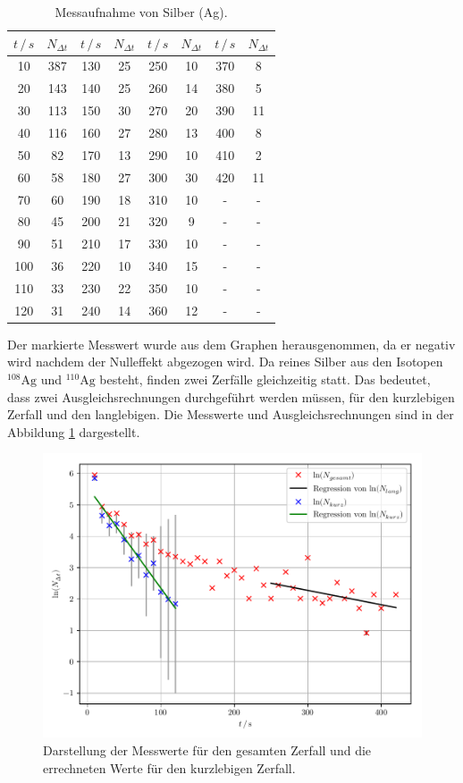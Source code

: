 \begin{table}[H]
  \centering
  \caption{Messaufnahme von Silber (Ag).}
  \label{tab:2}
  \begin{tabular}{c c c c c c c c}
    \toprule
    $t \, /\, s$& $N_{\Delta t}$& $t \, /\, s$& $N_{\Delta t}$ & $t \, /\, s$& $N_{\Delta t}$ & $t \, /\, s$& $N_{\Delta t}$ \\
    \midrule
    10 & 387 & 130 & 25 & 250 & 10 & 370 & 8\\
    20 & 143 & 140 & 25 & 260 & 14 & 380 & 5\\
    30 & 113 & 150 & 30 & 270 & 20 & 390 & 11\\
    40 & 116 & 160 & 27 & 280 & 13 & 400 & 8\\
    50 & 82 & 170 & 13 & 290 & 10 & 410 & \cellcolor{red}2\\
    60 & 58 & 180 & 27 & 300 & 30 & 420 & 11\\
    70 & 60 & 190 & 18 & 310 & 10 & -&-\\
    80 & 45 & 200 & 21 & 320 & 9 & -& - \\
    90 & 51 & 210 & 17 & 330 & 10 & -& -\\
    100 & 36 & 220 & 10 & 340 & 15 &- &-\\
    110 & 33 & 230 & 22 & 350 & 10 &- &-\\
    120 & 31 & 240 & 14 & 360 & 12 &- &-\\
    \bottomrule
  \end{tabular}
\end{table}

Der markierte Messwert wurde aus dem Graphen herausgenommen, da er negativ wird
nachdem der Nulleffekt abgezogen wird.
Da reines Silber aus den Isotopen $^{108}\text{Ag}$ und $^{110}\text{Ag}$ besteht, finden zwei Zerfälle
gleichzeitig statt. Das bedeutet, dass zwei Ausgleichsrechnungen
durchgeführt werden müssen, für den kurzlebigen Zerfall und den langlebigen.
Die Messwerte und Ausgleichsrechnungen sind in der Abbildung \ref{abb:4} dargestellt.

\begin{figure}[H]
  \centering
  \includegraphics{plot1.pdf}
  \caption{Darstellung der Messwerte für den gesamten Zerfall und die errechneten Werte
  für den kurzlebigen Zerfall.}
  \label{abb:4}
\end{figure}

